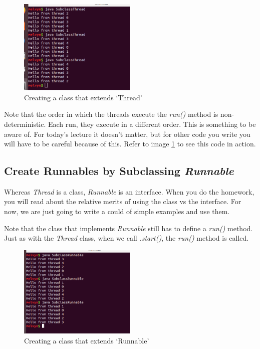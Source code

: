 \documentclass[12pt]{article}
\begin{document}
\begin{figure}[ht]
  \label{runningSubclassThread}
  \centering
    \includegraphics[width=0.5\textwidth]{Images/runningSubclassThread.png}
  \caption{Creating a class that extends `Thread'}
\end{figure}


Note that the order in which the threads execute the \textit{run()} method is
non-deterministic. Each run, they execute in a different order. This is
something to be aware of. For today's lecture it doesn't matter, but for other
code you write you will have to be careful because of this. Refer to image
\ref{runningSubclassThread} to see this code in action.

\subsection{Create Runnables by Subclassing \textit{Runnable}}

Whereas \textit{Thread} is a class, \textit{Runnable} is an interface. When you
do the homework, you will read about the relative merits of using the class vs
the interface. For now, we are just going to write a could of simple examples
and use them.

Note that the class that implements \textit{Runnable} still has to define a
\textit{run()} method. Just as with the \textit{Thread} class, when we call
\textit{.start()}, the \textit{run()} method is called.




\begin{figure}[ht]
  \label{runningSubclassRunnable}
  \centering
    \includegraphics[width=0.5\textwidth]{Images/runningSubclassRunnable.png}
  \caption{Creating a class that extends `Runnable'}
\end{figure}
\end{document}
